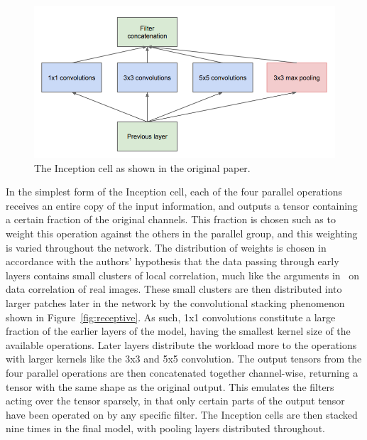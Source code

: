 \begin{figure}
    \center
    \includegraphics[width=.8\linewidth]{inception_cell}
    \caption[The Inception cell]{The Inception cell as shown in the original paper.}
    \label{fig:inception}
\end{figure}

In the simplest form of the Inception cell, each of the four parallel operations receives an entire copy of the
input information, and outputs a tensor containing a certain fraction of the original channels. This fraction is chosen
such as to weight this operation against the others in the parallel group, and this weighting is varied throughout the network.
The distribution of weights is chosen in accordance with the authors' hypothesis that the data passing through early layers
contains small clusters of local correlation, much like the arguments in~\cite{kriv2009} on data correlation of real images.
These small clusters are then distributed into larger patches later in the network by the
convolutional stacking phenomenon shown in Figure~\ref{fig:receptive}. As such, 1x1 convolutions constitute a large fraction
of the earlier layers of the model, having the smallest kernel size of the available operations. Later layers distribute
the workload more to the operations with larger kernels like the 3x3 and 5x5 convolution.
The output tensors from the four parallel operations are then concatenated together channel-wise, returning a tensor
with the same shape as the original output. This emulates the filters acting over the tensor sparsely, in that only certain parts of the output tensor
have been operated on by any specific filter. The Inception cells are then stacked nine times in the final model,
with pooling layers distributed throughout.


